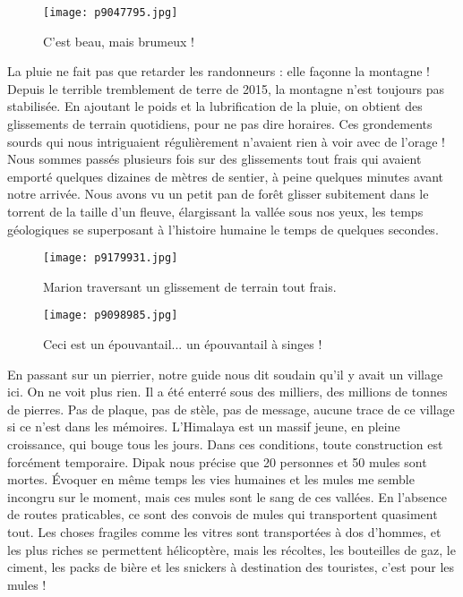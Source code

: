 \documentclass{book}
\begin{document}
\begin{figure}[h]
\centering
\texttt{[image: p9047795.jpg]}
\caption*{C'est beau, mais brumeux !}
\end{figure}

La pluie ne fait pas que retarder les randonneurs : elle façonne la montagne ! Depuis le terrible tremblement de terre de 2015, la montagne n'est toujours pas stabilisée. En ajoutant le poids et la lubrification de la pluie, on obtient des glissements de terrain quotidiens, pour ne pas dire horaires. Ces grondements sourds qui nous intriguaient régulièrement n'avaient rien à voir avec de l'orage ! Nous sommes passés plusieurs fois sur des glissements tout frais qui avaient emporté quelques dizaines de mètres de sentier, à peine quelques minutes avant notre arrivée. Nous avons vu un petit pan de forêt glisser subitement dans le torrent de la taille d'un fleuve, élargissant la vallée sous nos yeux, les temps géologiques se superposant à l'histoire humaine le temps de quelques secondes.


\begin{figure}[h]
\centering
\texttt{[image: p9179931.jpg]}
\caption*{Marion traversant un glissement de terrain tout frais.}
\end{figure}


\begin{figure}[h]
\centering
\texttt{[image: p9098985.jpg]}
\caption*{Ceci est un épouvantail... un épouvantail à singes !}
\end{figure}

En passant sur un pierrier, notre guide nous dit soudain qu'il y avait un village ici. On ne voit plus rien. Il a été enterré sous des milliers, des millions de tonnes de pierres. Pas de plaque, pas de stèle, pas de message, aucune trace de ce village si ce n'est dans les mémoires. L'Himalaya est un massif jeune, en pleine croissance, qui bouge tous les jours. Dans ces conditions, toute construction est forcément temporaire. Dipak nous précise que 20 personnes et 50 mules sont mortes. Évoquer en même temps les vies humaines et les mules me semble incongru sur le moment, mais ces mules sont le sang de ces vallées. En l'absence de routes praticables, ce sont des convois de mules qui transportent quasiment tout. Les choses fragiles comme les vitres sont transportées à dos d'hommes, et les plus riches se permettent hélicoptère, mais les récoltes, les bouteilles de gaz, le ciment, les packs de bière et les snickers à destination des touristes, c'est pour les mules !
\end{document}
